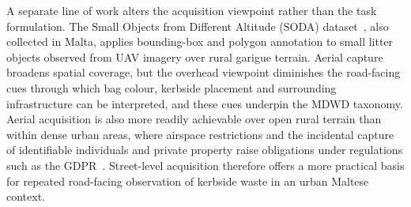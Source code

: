 A separate line of work alters the acquisition viewpoint rather than the task formulation. The Small Objects from Different Altitude (SODA) dataset~\cite{pisani2024soda}, also collected in Malta, applies bounding-box and polygon annotation to small litter objects observed from \gls{UAV} imagery over rural garigue terrain. Aerial capture broadens spatial coverage, but the overhead viewpoint diminishes the road-facing cues through which bag colour, kerbside placement and surrounding infrastructure can be interpreted, and these cues underpin the \gls{MDWD} taxonomy. Aerial acquisition is also more readily achievable over open rural terrain than within dense urban areas, where airspace restrictions and the incidental capture of identifiable individuals and private property raise obligations under regulations such as the \gls{GDPR}~\cite{lee2022uavprivacy}. Street-level acquisition therefore offers a more practical basis for repeated road-facing observation of kerbside waste in an urban Maltese context.


